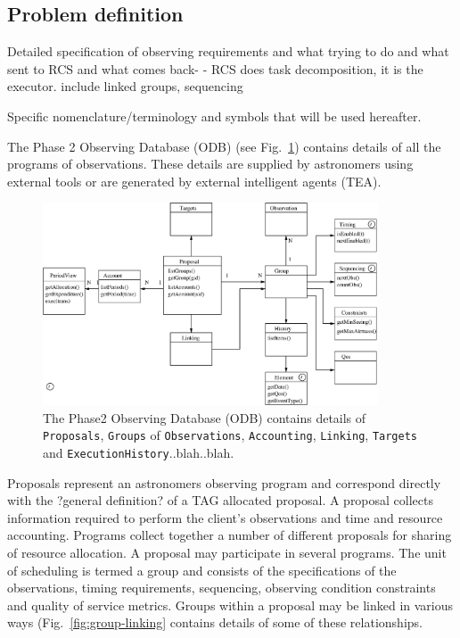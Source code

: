 \subsection{Problem definition}
Detailed specification of observing requirements and what trying to do and what sent to RCS and what comes back- - RCS does task decomposition, it is the executor. include linked groups, sequencing 

Specific nomenclature/terminology and symbols that will be used hereafter.



The Phase 2 Observing Database (ODB) (see Fig.~\ref{fig:phase2-architecture}) contains details of all the programs of observations. These details are supplied by astronomers using external tools \cite{clayandfraser06tbd} or are generated by external intelligent agents \cite{xxx} (TEA).

   \begin{figure}[h]
   \begin{center}
   \includegraphics[height=6cm]{figures/phase2_architecture.eps}
   \end{center}
  
   \caption[Phase2 Architecture.] 
   {The Phase2 Observing Database (ODB) contains details of {\tt Proposals}, {\tt Groups} of {\tt Observations}, {\tt Accounting}, {\tt Linking}, {\tt Targets} and {\tt ExecutionHistory}..blah..blah.}
   \label{fig:phase2-architecture} 
   \end{figure} 

Proposals represent an astronomers observing program and correspond directly with the ?general definition? of a TAG allocated proposal. A proposal collects information required to perform the client's observations and time and resource accounting.  Programs collect together a number of different proposals for sharing of resource allocation. A proposal may participate in several programs. The unit of scheduling is termed a group and consists of the specifications of the observations, timing requirements, sequencing, observing condition constraints and quality of service metrics. Groups within a proposal may be linked in various ways (Fig.~\ref{fig:group-linking} contains details of some of these relationships.


